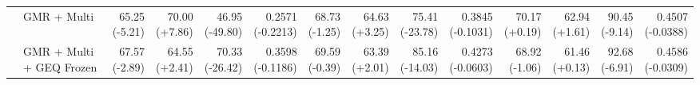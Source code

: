 \documentclass{article}
\begin{document}
{\begin{tabular}{llrrrrrrrrrrrr}
 & GMR + Multi & \shortstack{65.25 \\ {\scriptsize\textcolor{Loss}{(-5.21)}}} & \shortstack{70.00 \\ {\scriptsize\textcolor{Gain}{(+7.86)}}} & \shortstack{46.95 \\ {\scriptsize\textcolor{Loss}{(-49.80)}}} & \shortstack{0.2571 \\ {\scriptsize\textcolor{Loss}{(-0.2213)}}} & \shortstack{68.73 \\ {\scriptsize\textcolor{Loss}{(-1.25)}}} & \shortstack{64.63 \\ {\scriptsize\textcolor{Gain}{(+3.25)}}} & \shortstack{75.41 \\ {\scriptsize\textcolor{Loss}{(-23.78)}}} & \shortstack{0.3845 \\ {\scriptsize\textcolor{Loss}{(-0.1031)}}} & \shortstack{70.17 \\ {\scriptsize\textcolor{Gain}{(+0.19)}}} & \shortstack{62.94 \\ {\scriptsize\textcolor{Gain}{(+1.61)}}} & \shortstack{90.45 \\ {\scriptsize\textcolor{Loss}{(-9.14)}}} & \shortstack{0.4507 \\ {\scriptsize\textcolor{Loss}{(-0.0388)}}} \\
 & GMR + Multi + GEQ Frozen & \shortstack{67.57 \\ {\scriptsize\textcolor{Loss}{(-2.89)}}} & \shortstack{64.55 \\ {\scriptsize\textcolor{Gain}{(+2.41)}}} & \shortstack{70.33 \\ {\scriptsize\textcolor{Loss}{(-26.42)}}} & \shortstack{0.3598 \\ {\scriptsize\textcolor{Loss}{(-0.1186)}}} & \shortstack{69.59 \\ {\scriptsize\textcolor{Loss}{(-0.39)}}} & \shortstack{63.39 \\ {\scriptsize\textcolor{Gain}{(+2.01)}}} & \shortstack{85.16 \\ {\scriptsize\textcolor{Loss}{(-14.03)}}} & \shortstack{0.4273 \\ {\scriptsize\textcolor{Loss}{(-0.0603)}}} & \shortstack{68.92 \\ {\scriptsize\textcolor{Loss}{(-1.06)}}} & \shortstack{61.46 \\ {\scriptsize\textcolor{Gain}{(+0.13)}}} & \shortstack{92.68 \\ {\scriptsize\textcolor{Loss}{(-6.91)}}} & \shortstack{0.4586 \\ {\scriptsize\textcolor{Loss}{(-0.0309)}}} \\

\end{tabular}}
\end{document}
